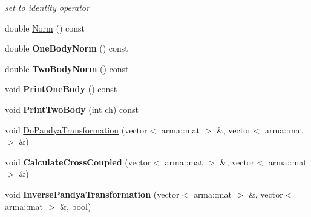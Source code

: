 \begin{DoxyCompactItemize}
\begin{DoxyCompactList}\small\item\em set to identity operator \end{DoxyCompactList}\item 
double \hyperlink{classOperator_acb9d7959232a636191b91f6bf5b7b0c8}{Norm} () const 
\item 
\hypertarget{classOperator_a72dc7aea85c7775097d235de6f17f330}{double {\bfseries One\-Body\-Norm} () const }\label{classOperator_a72dc7aea85c7775097d235de6f17f330}

\item 
\hypertarget{classOperator_af1c40bdef64ec9abd5d95e8328565a67}{double {\bfseries Two\-Body\-Norm} () const }\label{classOperator_af1c40bdef64ec9abd5d95e8328565a67}

\item 
\hypertarget{classOperator_a5ec5a8110337108ac31d3af7337e454b}{void {\bfseries Print\-One\-Body} () const }\label{classOperator_a5ec5a8110337108ac31d3af7337e454b}

\item 
\hypertarget{classOperator_a905e42cefafaca0eb155cf41b3cd37b8}{void {\bfseries Print\-Two\-Body} (int ch) const }\label{classOperator_a905e42cefafaca0eb155cf41b3cd37b8}

\item 
void \hyperlink{classOperator_ad468922e03d15318c23886e6bfecc168}{Do\-Pandya\-Transformation} (vector$<$ arma\-::mat $>$ \&, vector$<$ arma\-::mat $>$ \&)
\item 
\hypertarget{classOperator_aa9082f11f4b3aaf4bb08c058c4dca707}{void {\bfseries Calculate\-Cross\-Coupled} (vector$<$ arma\-::mat $>$ \&, vector$<$ arma\-::mat $>$ \&)}\label{classOperator_aa9082f11f4b3aaf4bb08c058c4dca707}

\item 
\hypertarget{classOperator_ae7827c8ef5240bd3436be60bd5632900}{void {\bfseries Inverse\-Pandya\-Transformation} (vector$<$ arma\-::mat $>$ \&, vector$<$ arma\-::mat $>$ \&, bool)}\label{classOperator_ae7827c8ef5240bd3436be60bd5632900}


\end{DoxyCompactItemize}
